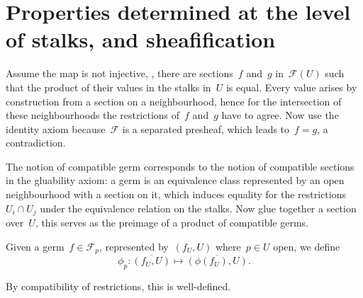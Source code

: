 \section{Properties determined at the level of stalks, and sheafification}

\begin{exercise}
  Assume the map is not injective, \ie, there are sections~$f$ and~$g$ in~$\mathcal{F}(U)$ such that the product of their values in the stalks in~$U$ is equal. Every value arises by construction from a section on a neighbourhood, hence for the intersection of these neighbourhoods the restrictions of~$f$ and~$g$ have to agree. Now use the identity axiom because~$\mathcal{F}$ is a separated presheaf, which leads to~$f=g$, a contradiction.
\end{exercise}

\begin{exercise}
  The notion of compatible germ corresponds to the notion of compatible sections in the gluability axiom: a germ is an equivalence class represented by an open neighbourhood with a section on it, which induces equality for the restrictions~$U_i\cap U_j$ under the equivalence relation on the stalks. Now glue together a section over~$U$, this serves as the preimage of a product of compatible germs.
\end{exercise}

\begin{exercise}
  Given a germ~$f\in\mathcal{F}_p$, represented by~$(f_U,U)$ where~$p\in U$ open, we define
  \begin{equation}
    \phi_p\colon \overline{(f_U,U)}\mapsto\overline{(\phi(f_U),U)}.
  \end{equation}

  By compatibility of restrictions, this is well-defined.
\end{exercise}
